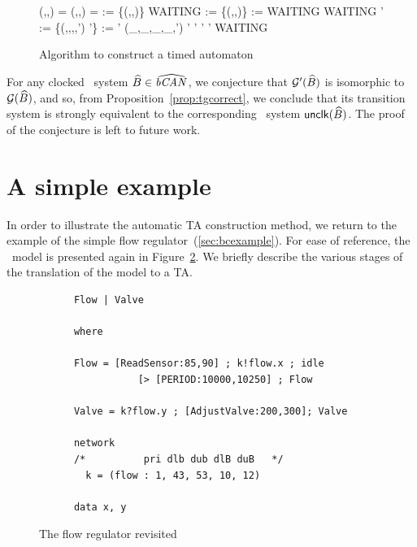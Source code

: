 \begin{figure}
\NumberProgramstrue
\begin{center}
\small
\begin{programbox}
\INPUT
   (\PP,\NN,\D) 
   \RR = (\W,\T,\WI) = \mknet{\PP}
\ENDINPUT
\OUTPUT
   \tglocs
   \tgedges
\ENDOUTPUT
\BEGIN
\tglocs := \{(\WI,\NN,\D)\}
WAITING := \{(\WI,\NN,\D)\}
\tgedges := \emptyset
\WHILE WAITING \neq \emptyset \DO
   \tgloc {} WAITING
  \tgedges' := \{(\tgloc,\tgguard,\any,\resets,\tgloc') \vbar \tgloc  \goesr{\tgguard,\any,\resets} \tgloc'\}
  \tgedges := \tgedges \cup \tgedges' 
  \FOREACH (\_,\_,\_,\_,\tgloc') \in \tgedges' \DO
    \IF \tgloc' \notin \tglocs
       \tgloc'  \tglocs
       \tgloc'  WAITING
    \FI
  \OD
\OD
\END
\end{programbox}
\end{center}
\caption{Algorithm to construct a timed automaton\label{fig:tgmkgraph}}
\end{figure}
For any clocked \bcandle\ system ${\widehat{{B}}} \in {\widehat{{\text{\it bCAN\/}_{}}}}$, we conjecture that
$\GrImpl(\csys)$ is isomorphic to $\Gr(\csys)$, and so, from
Proposition~\ref{prop:tgcorrect}, we
conclude that its transition system is strongly equivalent to the
corresponding \bcandle\ system ${\mathop{{\sf unclk}}}({\widehat{{B}}})$. The proof of the conjecture
is left to future work.

\section{A simple example}\label{sec:tgexample}
In order to illustrate the automatic TA construction method, we return
to the example of the simple flow regulator~(\Sec\ref{sec:bcexample}).
For ease of reference, the \bcandle\ model is presented again in
Figure~\ref{fig:tgflowagain}. We briefly describe the various stages
of the translation of the model to a TA.
\begin{figure}
\small
\begin{verbatim}
      Flow | Valve

      where

      Flow = [ReadSensor:85,90] ; k!flow.x ; idle 
                 [> [PERIOD:10000,10250] ; Flow

      Valve = k?flow.y ; [AdjustValve:200,300]; Valve

      network
      /*          pri dlb dub dlB duB   */
        k = (flow : 1, 43, 53, 10, 12)

      data x, y
\end{verbatim}
\caption{The flow regulator revisited\label{fig:tgflowagain}}
\end{figure}

